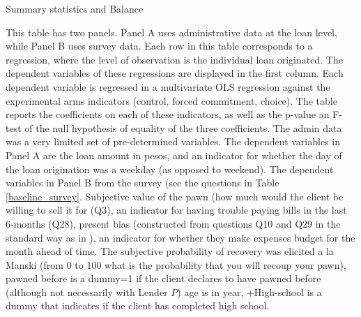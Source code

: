 \documentclass[oneside,11pt]{article}
\begin{document}
\newpage
\begin{table}[H]
\caption{Summary statistics and Balance}
\label{SS}
\begin{center}
\scriptsize{}
\end{center}

\end{table}
\vspace{-.3in}
\scriptsize {
\noindent This table has two panels. Panel A uses administrative data at the loan level, while Panel B uses survey data. Each row in this table corresponds to a regression, where the level of observation is the individual loan originated. The dependent variables of these regressions are displayed in the first column. Each dependent variable is regressed in a multivariate OLS regression against the experimental arms indicators (control, forced commitment, choice). The table reports the coefficients on each of these indicators, as well as the p-value an F-test of the null hypothesis of equality of the three coefficients. The admin data was a very limited set of pre-determined variables. The dependent variables in Panel A are the loan amount in pesos, and an indicator for whether the day of the loan origination was a weekday (as opposed to weekend). The dependent variables in Panel B from the survey (see the questions in Table \ref{baseline_survey}. Subjective value of the pawn (how much would the client be willing to sell it for (Q3), an indicator for having trouble paying bills in the last 6-months (Q28), present bias (constructed from questions Q10 and Q29 in the standard way as in \cite{Ashraf}), an indicator for whether they make expenses budget for the month ahead of time. The subjective probability of recovery was elicited a la Manski (from 0 to 100 what is the probability that you will recoup your pawn), pawned before is a dummy=1 if the client declares to have pawned before (although not necessarily with Lender $P$) age is in year, +High-school is a dummy that indicates if the client has completed high school. 
}



\newpage

\vspace{.2in}
\end{document}
